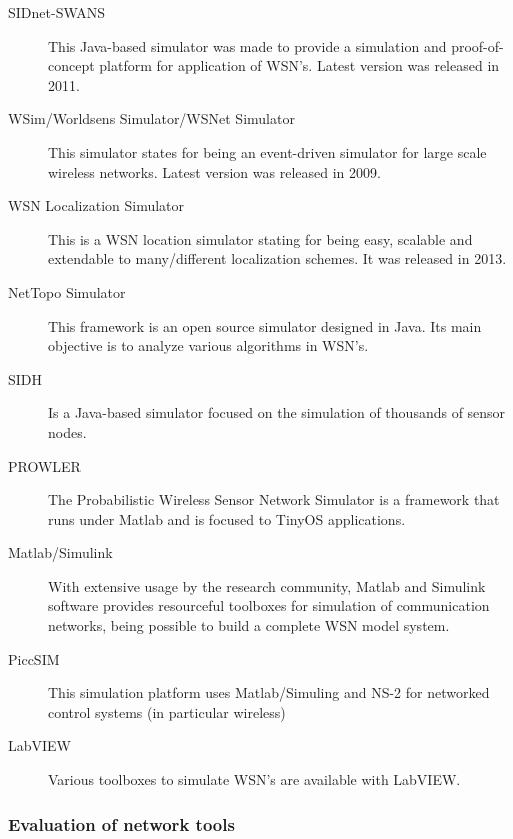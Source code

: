 \begin{description}
	\item [SIDnet-SWANS]
	This Java-based simulator was made to provide a simulation and proof-of-concept platform for application of WSN's.
	Latest version was released in 2011.
	
	\item [WSim/Worldsens Simulator/WSNet Simulator]
	This simulator states for being an event-driven simulator for large scale wireless networks. Latest version was released in 2009.

	\item [WSN Localization Simulator]
	This is a WSN location simulator stating for being easy, scalable and extendable to many/different localization schemes. It was released in 2013.
	
	\item [NetTopo Simulator]
	This framework is an open source simulator designed in Java. Its main objective is to analyze various algorithms in WSN's. 
	
	\item [SIDH]
	Is a Java-based simulator focused on the simulation of thousands of sensor nodes.
	
	\item [PROWLER]
	The Probabilistic Wireless Sensor Network Simulator is a framework that runs under Matlab and is focused to TinyOS applications.
	
	\item [Matlab/Simulink]
	With extensive usage by the research community, Matlab and Simulink software provides resourceful toolboxes for simulation of communication networks, being possible to build a complete WSN model system.
	
	\item [PiccSIM]
	This simulation platform uses Matlab/Simuling and NS-2 for networked control systems (in particular wireless)
	
	\item [LabVIEW]
	Various toolboxes to simulate WSN's are available with LabVIEW.
	
\end{description}


\subsubsection{Evaluation of network tools}


